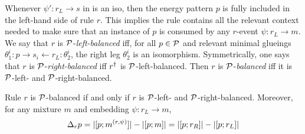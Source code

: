 Whenever $\psi': r_L \to s$ in  is an iso,
then the energy pattern $p$ is fully included %
in the left-hand side of rule $r$.
This implies the rule contains all the relevant context needed
to make sure that an instance of $p$ is consumed
by any $r$-event $\psi: r_L \to m$.
We say that $r$ is $\mathcal{P}$-\emph{left-balanced} iff,
for all $p \in \mathcal{P}$ and relevant minimal glueings
$\theta^i_1: p \to s_i \gets r_L :\theta^i_2$,
the right leg $\theta^i_2$ is an isomorphism.
Symmetrically, one says that $r$ is $\mathcal{P}$-\emph{right-balanced}
iff $r^\dagger$ is $\mathcal{P}$-left-balanced.
Then $r$ is $\mathcal{P}$-\emph{balanced}
iff it is $\mathcal{P}$-left- and $\mathcal{P}$-right-balanced.

\begin{lemma}
  Rule $r$ is $\mathcal{P}$-balanced if and only if
  $r$ is $\mathcal{P}$-left- and $\mathcal{P}$-right-balanced.
  Moreover, for any mixture $m$ and embedding $\psi: r_L \to m$,
  \[ \Delta_r p = |[p;m^{(r,\psi)}]| %
                - \abs{\matches{p}{m}}
                = \abs{\matches{p}{r_R}}
                - \abs{\matches{p}{r_L}} \]
\end{lemma}

